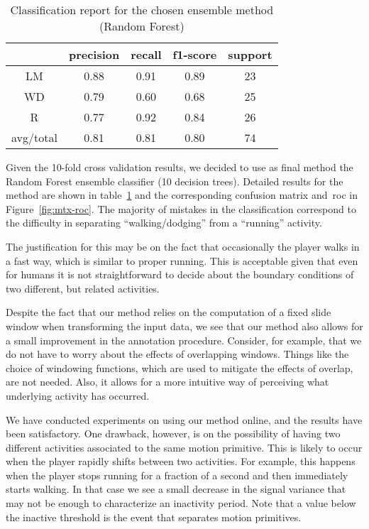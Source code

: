 \begin{table}[h]\footnotesize
  \centering
  \caption{Classification report for the chosen ensemble method (Random Forest) %
  }
  \begin{tabular}{| c | c | c | c | c |}
    \hline
  	   & precision   & recall & f1-score &  support \\\hline
    LM &      0.88   &  0.91  &    0.89  &      23  \\\hline
    WD &      0.79   &  0.60 &     0.68 &       25  \\\hline
     R &      0.77   &  0.92 &     0.84 &       26  \\\hline
avg/total &   0.81   &  0.81 &     0.80 &       74  \\\hline
  \end{tabular}
  \label{report}
\end{table}

Given the 10-fold cross validation results, we decided to use as final method the Random Forest ensemble classifier (10 decision trees). Detailed results for the method are shown in table~\ref{report} and the corresponding confusion matrix and~\gls{roc} in Figure~\ref{fig:mtx-roc}. The majority of mistakes in the classification correspond to the difficulty in separating ``walking/dodging'' from  a ``running'' activity. 

The justification for this may be on the fact that occasionally the player walks in a fast way, which is similar to proper running. This is acceptable given that even for humans it is not straightforward to decide about the boundary conditions of two different, but related activities.

Despite the fact that our method relies on the computation of a fixed slide window when transforming the input data, we see that our method also allows for a small improvement in the annotation procedure. Consider, for example, that we do not have to worry about the effects of overlapping windows. Things like the choice of windowing functions, which are used to mitigate the effects of overlap, are not needed. Also, it allows for a more intuitive way of perceiving what underlying activity has occurred.

We have conducted experiments on using our method online, and the results have been satisfactory. One drawback, however, is on the possibility of having two different activities associated to the same motion primitive. This is likely to occur when the player rapidly shifts between two activities. For example, this happens when the player stops running for a fraction of a second and then immediately starts walking. In that case we see a small decrease in the signal variance that may not be enough to characterize an inactivity period. Note that a value below the inactive threshold is the event that separates motion primitives.

